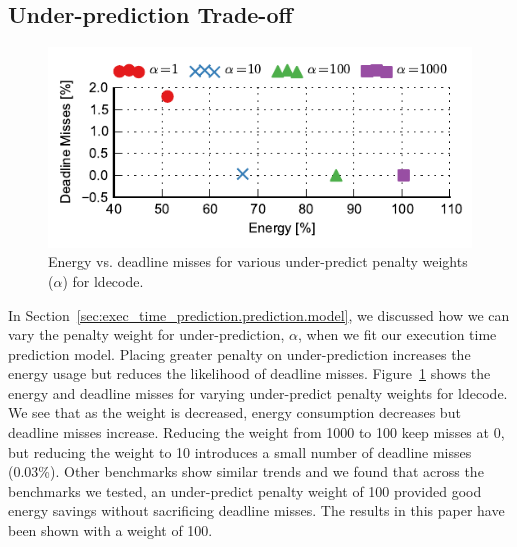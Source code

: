 \subsection{Under-prediction Trade-off}

\begin{figure}
  \begin{center}
    \includegraphics{exec_time_prediction/data/underpredict_sweep.pdf}
    \caption{Energy vs. deadline misses for various under-predict penalty
    weights ($\alpha$) for ldecode.}
    \label{fig:exec_time_prediction.evaluation.underpredict_sweep}
  \end{center}
\end{figure}

In Section~\ref{sec:exec_time_prediction.prediction.model}, we discussed how we
can vary the penalty weight for under-prediction, $\alpha$, when we fit our
execution time prediction model. Placing greater penalty on under-prediction
increases the energy usage but reduces the likelihood of deadline misses.
Figure~\ref{fig:exec_time_prediction.evaluation.underpredict_sweep} shows the
energy and deadline misses for varying under-predict penalty weights for
ldecode. We see that as the weight is decreased, energy consumption decreases
but deadline misses increase. Reducing the weight from 1000 to 100 keep misses
at 0, but reducing the weight to 10 introduces a small number of deadline
misses (0.03\%). Other benchmarks show similar trends and we found that across
the benchmarks we tested, an under-predict penalty weight of 100 provided good
energy savings without sacrificing deadline misses. The results in this paper
have been shown with a weight of 100.

